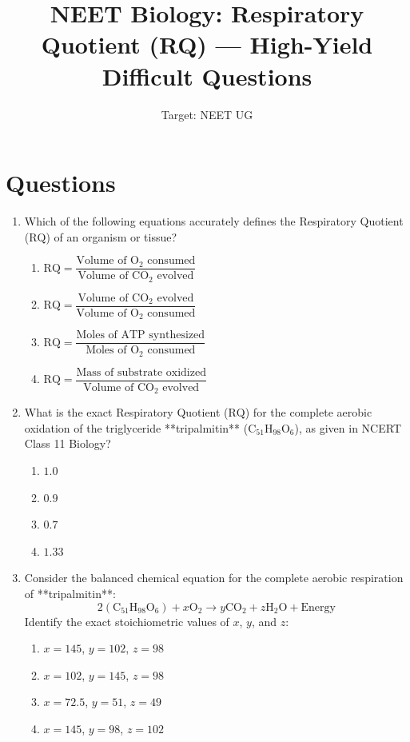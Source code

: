 \documentclass[11pt, a4paper]{article}
\title{\textbf{NEET Biology: Respiratory Quotient (RQ) — High-Yield Difficult Questions}}
\author{Target: NEET UG}
\date{}
\begin{document}
\maketitle

\section*{Questions}

\begin{enumerate}[label=\textbf{\arabic*.}]

\item Which of the following equations accurately defines the Respiratory Quotient ($\text{RQ}$) of an organism or tissue?
\begin{enumerate}[label=(\Alph*)]
    \item $\text{RQ} = \dfrac{\text{Volume of } \text{O}_2 \text{ consumed}}{\text{Volume of } \text{CO}_2 \text{ evolved}}$
    \item $\text{RQ} = \dfrac{\text{Volume of } \text{CO}_2 \text{ evolved}}{\text{Volume of } \text{O}_2 \text{ consumed}}$
    \item $\text{RQ} = \dfrac{\text{Moles of } \text{ATP} \text{ synthesized}}{\text{Moles of } \text{O}_2 \text{ consumed}}$
    \item $\text{RQ} = \dfrac{\text{Mass of substrate oxidized}}{\text{Volume of } \text{CO}_2 \text{ evolved}}$
\end{enumerate}

\item What is the exact Respiratory Quotient ($\text{RQ}$) for the complete aerobic oxidation of the triglyceride **tripalmitin** ($\text{C}_{51}\text{H}_{98}\text{O}_6$), as given in NCERT Class 11 Biology?
\begin{enumerate}[label=(\Alph*)]
    \item $1.0$
    \item $0.9$
    \item $0.7$
    \item $1.33$
\end{enumerate}

\item Consider the balanced chemical equation for the complete aerobic respiration of **tripalmitin**:
$$2(\text{C}_{51}\text{H}_{98}\text{O}_6) + x\text{O}_2 \longrightarrow y\text{CO}_2 + z\text{H}_2\text{O} + \text{Energy}$$
Identify the exact stoichiometric values of $x$, $y$, and $z$:
\begin{enumerate}[label=(\Alph*)]
    \item $x = 145$, $y = 102$, $z = 98$
    \item $x = 102$, $y = 145$, $z = 98$
    \item $x = 72.5$, $y = 51$, $z = 49$
    \item $x = 145$, $y = 98$, $z = 102$
\end{enumerate}


\end{enumerate}
\end{document}
